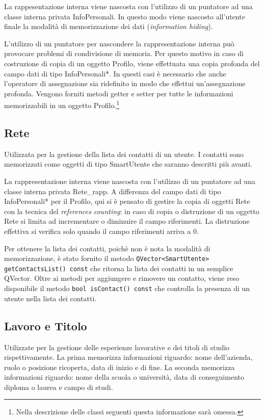 \documentclass[a4paper,openany]{article}
\begin{document}
La rappesentazione interna viene nascosta con l'utilizzo di un puntatore ad una classe interna privata InfoPersonali. In questo modo viene nascosto all'utente finale la modalità di memorizzazione dei dati (\textit{information hiding}).

L'utilizzo di un puntatore per nascondere la rappresentazione interna può provocare problemi di condivisione di memoria. Per questo motivo in caso di costruzione di copia di un oggetto Profilo, viene effettuata una copia profonda del campo dati di tipo InfoPersonali*. In questi casi è necessario che anche l'operatore di assegnazione sia ridefinito in modo che effettui un'assegnazione profonda. Vengono forniti metodi getter e setter per tutte le informazioni memorizzabili in un oggetto Profilo.\footnote{Nella descrizione delle classi seguenti questa informazione sarà omessa.}

\subsection*{Rete}
Utilizzata per la gestione della lista dei contatti di un utente. I contatti sono memorizzati come oggetti di tipo SmartUtente che saranno descritti più avanti.

La rappresentazione interna viene nascosta con l'utilizzo di un puntatore ad una classe interna privata Rete\_rapp. A differenza del campo dati di tipo InfoPersonali* per il Profilo, qui si è pensato di gestire la copia di oggetti Rete con la tecnica del \textit{references counting}: in caso di copia o distruzione di un oggetto Rete si limita ad incrementare o diminuire il campo riferimenti. La distruzione effettiva si verifica solo quando il campo riferimenti arriva a 0.

Per ottenere la lista dei contatti, poichè non è nota la modalità di memorizzazione, è stato fornito il metodo \texttt{QVector<SmartUtente> getContactsList() const} che ritorna la lista dei contatti in un semplice QVector. Oltre ai metodi per aggiungere e rimovere un contatto, viene reso disponibile il metodo \texttt{bool isContact() const} che controlla la presenza di un utente nella lista dei contatti.

\subsection*{Lavoro e Titolo}
Utilizzate per la gestione delle esperienze lavorative e dei titoli di studio rispettivamente. La prima memorizza informazioni riguardo: nome dell'azienda, ruolo o posizione ricoperta, data di inizio e di fine. La seconda memorizza informazioni riguardo: nome della scuola o università, data di conseguimento diploma o laurea e campo di studi.
\end{document}
